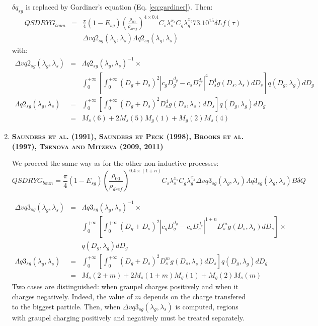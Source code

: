 \begin{enumerate}
$\delta q_{sg}$ is replaced by Gardiner's equation (Eq. \ref{eq:gardiner}).
Then:
\begin{eqnarray}
  QSDRYG_{boun} &=& \frac{\pi}{4} (1 - E_{sg})
    \left( \frac{\rho _{00}}{\rho _{dref}} \right)^{4 \times 0.4}
    C_s \lambda _s ^{x_s} C_g \lambda _g ^{x_g}
    73.10^{15} \delta L f(\tau) \nonumber \\
    & & \Delta vq2_{sg} (\lambda _g, \lambda _s)
        \Lambda q2_{sg} (\lambda _g, \lambda _s)
\end{eqnarray}
with:
\begin{eqnarray}
  \Delta vq2_{sg} (\lambda _g, \lambda _s) &=& 
    \Lambda q2_{sg} (\lambda _g, \lambda _s)^{-1} \times \\
    & & \int_0 ^{+ \infty} \left[ \int_0 ^{+ \infty} (D_g + D_s)^2
        |c_g D_g ^{d_g} - c_s D_s ^{d_s}|^4 D_s ^4
        g(D_s , \lambda _s) dD_s \right] q(D_g, \lambda _g) dD_g \nonumber \\
  \Lambda q2_{sg} (\lambda _g, \lambda _s) &=&
    \int_0 ^{+ \infty} \left[ \int_0 ^{+ \infty} (D_g + D_s)^2
      D_s ^4 g(D_s , \lambda _s) dD_s \right] q(D_g, \lambda _g) dD_g \nonumber \\
  &=& M_s (6) + 2 M_s (5) M_g (1) + M_g (2) M_s (4)
\end{eqnarray}


  \item {\bf \textsc{Saunders et al. (1991), Saunders et Peck (1998), Brooks et al. (1997), Tsenova and Mitzeva (2009, 2011)}}

We proceed the same way as for the other non-inductive processes:
\begin{equation}
  QSDRYG_{boun} = \frac{\pi}{4} (1 - E_{sg})
    \left( \frac{\rho _{00}}{\rho _{dref}} \right)^{0.4 \times (1+n)}
    C_s \lambda _s ^{x_s} C_g \lambda _g ^{x_g}
    \Delta vq3_{sg} (\lambda _g, \lambda _s)
    \Lambda q3_{sg} (\lambda _g, \lambda _s)
    B \delta Q 
\end{equation}

\begin{eqnarray}
  \Delta vq3_{sg} (\lambda _g, \lambda _s) &=& 
    \Lambda q3_{sg} (\lambda _g, \lambda _s)^{-1} \times \nonumber \\
    & & \int_0 ^{+ \infty} \left[ \int_0 ^{+ \infty} (D_g + D_s)^2
        |c_g D_g ^{d_g} - c_s D_s ^{d_s}|^{1+n} D_s ^m
        g(D_s , \lambda _s) dD_s \right] \times \nonumber \\
    & & q(D_g, \lambda _g) dD_g \\
  \Lambda q3_{sg} (\lambda _g, \lambda _s) &=&
    \int_0 ^{+ \infty} \left[ \int_0 ^{+ \infty} (D_g + D_s)^2
      D_s ^m g(D_s , \lambda _s) dD_s \right] q(D_g, \lambda _g) dD_g \nonumber \\
  &=& M_s (2 + m) + 2 M_s (1 + m) M_g (1) + M_g (2) M_s (m)
\end{eqnarray}
Two cases are distinguished: when graupel charges positively and when it charges negatively.
Indeed, the value of $m$ depends on the charge transfered to the biggest particle.
Then, when $\Delta vq3_{sg} (\lambda _g, \lambda _s)$ is computed, regions with graupel charging positively and negatively must be treated separately.


\end{enumerate}
